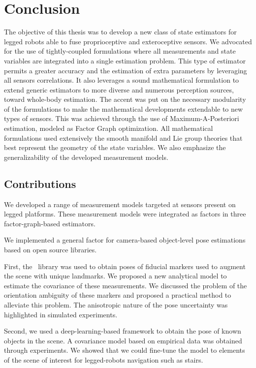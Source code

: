 \chapter{Conclusion}

The objective of this thesis was to develop a new class of state estimators for legged robots able to fuse proprioceptive and exteroceptive
sensors. We advocated for the use of tightly-coupled formulations where all measurements and state variables are integrated into a single estimation 
problem. This type of estimator permits a greater accuracy and the estimation of extra parameters by leveraging all sensors correlations.
It also leverages a sound mathematical formulation to extend generic estimators to more diverse and numerous perception sources, toward whole-body estimation.
The accent was put on the necessary modularity of the formulations to make the mathematical developments extendable to new types of sensors. This 
was achieved through the use of Maximum-A-Posteriori estimation, modeled as Factor Graph optimization. All mathematical formulations used extensively the smooth manifold
and Lie group theories that best represent the geometry of the state variables. We also emphasize the generalizability of the developed measurement models. 

\section{Contributions}

We developed a range of measurement models targeted at sensors present on legged platforms. These measurement models were integrated as factors in 
three factor-graph-based estimators.

\bigskip

We implemented a general factor for camera-based object-level pose estimations based on open source libraries. 

First, the \apriltag\ library was used 
to obtain poses of fiducial markers used to augment the scene with unique landmarks. We proposed a new analytical model to estimate the covariance of 
these measurements. We discussed the problem of the orientation ambiguity of these markers and proposed a practical method to alleviate this problem.
The anisotropic nature of the pose uncertainty was highlighted in simulated experiments. 

Second, we used a deep-learning-based framework to obtain the pose of known objects in the scene. A covariance model  based on empirical data was obtained through
experiments. We showed that we could fine-tune the model to elements of the scene of interest for legged-robots navigation such as stairs.

